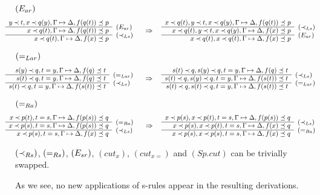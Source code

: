 \begin{PROOF}
\begin{LS}
\item $(E_{ar})$
\[\sma{\prarc{
y\Incl t, x\Incl q(y),\GSD, f(q(t))\preceq p \cl
          x\Incl q(t),\GSD, f(q(t))\preceq p & \rabove{\Ear} \cl
          x\Incl q(t),\GSD, f(x)\preceq p & \rabove{\iLs}
}\conv
\prarc{
x\Incl q(t), y\Incl t, x\Incl q(y),\GSD, f(q(t))\preceq p \cl
x\Incl q(t), y\Incl t, x\Incl q(y),\GSD, f(x)\preceq p & \rabove{\iLs} \cl
x\Incl q(t), x\Incl q(t),\GSD, f(x)\preceq p & \rabove{\Ear}
} }
\]
\item $(=_{Lar})$
\[\sma{ \prarc{
s(y)\Incl q, t=y,\GSD, f(q)\preceq t \cl
s(t)\Incl q, t=y,\GSD, f(q)\preceq t & \rabove{\eLar} \cl
s(t)\Incl q, t=y,\GSD, f(s(t))\preceq t & \rabove{\iLs} 
}\conv
\prarc{
s(t)\Incl q, s(y)\Incl q, t=y,\GSD, f(q)\preceq t \cl
s(t)\Incl q, s(y)\Incl q, t=y,\GSD, f(s(t))\preceq t & \rabove{\iLs} \cl
s(t)\Incl q, s(t)\Incl q, t=y,\GSD, f(s(t))\preceq t & \rabove{\eLar} 
} }
\]
\item $(=_{Ra})$
\[\sma{\prarc{
x\Incl p(t), t=s,\GSD, f(p(s))\preceq q \cl
x\Incl p(s), t=s,\GSD, f(p(s))\preceq q & \rabove{\eRa} \cl
x\Incl p(s), t=s,\GSD, f(x)\preceq q & \rabove{\iLs}
}\conv
\prarc{
x\Incl p(s), x\Incl p(t), t=s,\GSD, f(p(s))\preceq q \cl
x\Incl p(s), x\Incl p(t), t=s,\GSD, f(x)\preceq q & \rabove{\iLs} \cl
x\Incl p(s), x\Incl p(s), t=s,\GSD, f(x)\preceq q & \rabove{\eRa} 
} }
\]
\item $(\mathbin{\prec}_{Rs})$, $(=_{Rs})$, $(E_{sr})$, $(cut_x)$, $(cut_{x=})$ and $(Sp.cut)$ can be 
trivially swapped.
\end{LS}
As we see, no new applications of s-rules appear in the resulting derivations.
\end{PROOF}
%


